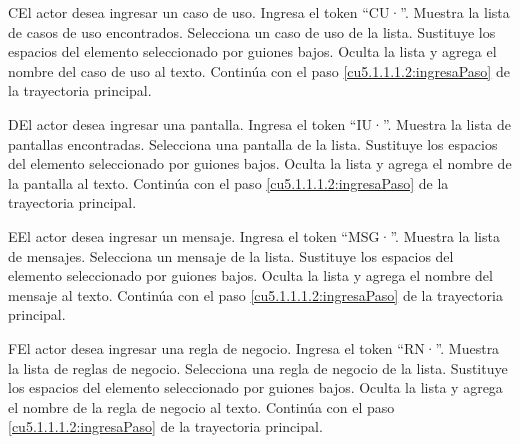  \begin{UCtrayectoriaA}{C}{El actor desea ingresar un caso de uso.}
  	\UCpaso[\UCactor] Ingresa el token ``CU·''.	
 	\UCpaso[\UCsist] Muestra la lista de casos de uso encontrados.
 	\UCpaso[\UCactor] Selecciona un caso de uso de la lista.
  	\UCpaso[\UCsist] Sustituye los espacios del elemento seleccionado por guiones bajos.
  	\UCpaso[\UCsist] Oculta la lista y agrega el nombre del caso de uso al texto.
    \UCpaso[] Continúa con el paso \ref{cu5.1.1.1.2:ingresaPaso} de la trayectoria principal.
 \end{UCtrayectoriaA}

 \begin{UCtrayectoriaA}{D}{El actor desea ingresar una pantalla.}
 	\UCpaso[\UCactor] Ingresa el token ``IU·''.	
 	\UCpaso[\UCsist] Muestra la lista de pantallas encontradas.
 	\UCpaso[\UCactor] Selecciona una pantalla de la lista.
  	\UCpaso[\UCsist] Sustituye los espacios del elemento seleccionado por guiones bajos.
  	\UCpaso[\UCsist] Oculta la lista y agrega el nombre de la pantalla al texto.
    \UCpaso[] Continúa con el paso \ref{cu5.1.1.1.2:ingresaPaso} de la trayectoria principal.
 \end{UCtrayectoriaA}

 \begin{UCtrayectoriaA}{E}{El actor desea ingresar un mensaje.}
 	 \UCpaso[\UCactor] Ingresa el token ``MSG·''.	
 	\UCpaso[\UCsist] Muestra la lista de mensajes.
 	\UCpaso[\UCactor] Selecciona un mensaje de la lista.
  	\UCpaso[\UCsist] Sustituye los espacios del elemento seleccionado por guiones bajos.
  	\UCpaso[\UCsist] Oculta la lista y agrega el nombre del mensaje al texto.
    \UCpaso[] Continúa con el paso \ref{cu5.1.1.1.2:ingresaPaso} de la trayectoria principal.
 \end{UCtrayectoriaA}

 \begin{UCtrayectoriaA}{F}{El actor desea ingresar una regla de negocio.}
 	\UCpaso[\UCactor] Ingresa el token ``RN·''.	
 	\UCpaso[\UCsist] Muestra la lista de reglas de negocio.
 	\UCpaso[\UCactor] Selecciona una regla de negocio de la lista.
  	\UCpaso[\UCsist] Sustituye los espacios del elemento seleccionado por guiones bajos.
  	\UCpaso[\UCsist] Oculta la lista y agrega el nombre de la regla de negocio al texto.
    \UCpaso[] Continúa con el paso \ref{cu5.1.1.1.2:ingresaPaso} de la trayectoria principal.
 \end{UCtrayectoriaA}

